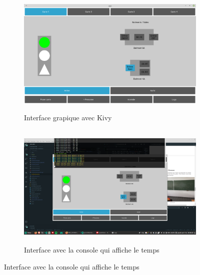 \documentclass[a4paper,10pt]{article}
\begin{document}
    \begin{figure}[h]
        \begin{subfigure}{1.0\textwidth}
            \includegraphics[width=1.0\linewidth, height=6cm]{image/interface-1.png}
             \caption{Interface grapique avec Kivy}
             \label{fig:interface1}
        \end{subfigure}
        \begin{subfigure}{1.0\textwidth}
            \includegraphics[width=1.0\linewidth, height=6cm]{image/interface-2.png}
             \caption{Interface avec la console qui affiche le temps}
             \label{fig:tableau}
        \end{subfigure}
    \end{figure}
    
    \pagebreak
\end{document}
